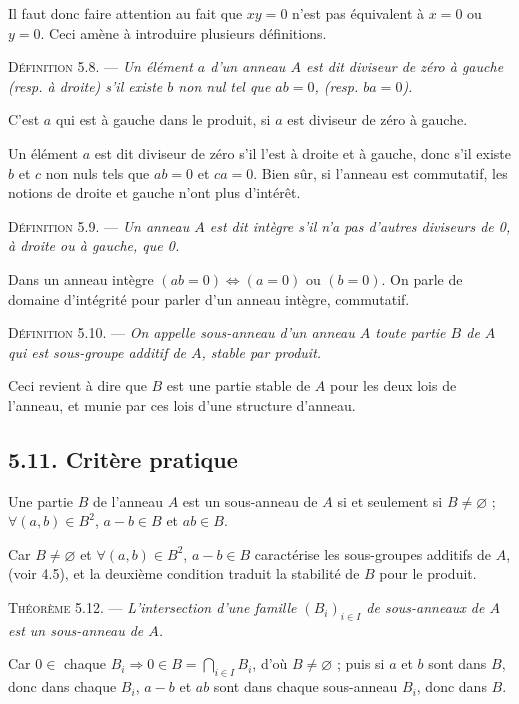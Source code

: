 Il faut donc faire attention au fait que $xy=0$ n'est pas équivalent à $x=0$ ou $y=0$. Ceci amène à introduire plusieurs définitions.

\medskip\noindent\textsc{Définition 5.8.} --- \emph{Un élément $a$ d'un anneau $A$ est dit diviseur de zéro à gauche (resp. à droite) s'il existe $b$ non nul tel que $ab=0$, (resp. $ba=0$).}

C'est $a$ qui est à gauche dans le produit, si $a$ est diviseur de zéro à gauche.

Un élément $a$ est dit diviseur de zéro s'il l'est à droite et à gauche, donc s'il existe $b$ et $c$ non nuls tels que $ab=0$ et $ca=0$. Bien sûr, si l'anneau est commutatif, les notions de droite et gauche n'ont plus d'intérêt.

\medskip\noindent\textsc{Définition 5.9.} --- \emph{Un anneau $A$ est dit intègre s'il n'a pas d'autres diviseurs de 0, à droite ou à gauche, que 0.}

Dans un anneau intègre $(ab=0)\Longleftrightarrow(a=0)$ ou $(b=0)$. On parle de domaine d'intégrité pour parler d'un anneau intègre, commutatif.

\medskip\noindent\textsc{Définition 5.10.} --- \emph{On appelle sous-anneau d'un anneau $A$ toute partie $B$ de $A$ qui est sous-groupe additif de $A$, stable par produit.}

Ceci revient à dire que $B$ est une partie stable de $A$ pour les deux lois de l'anneau, et munie par ces lois d'une structure d'anneau.

\subsection*{5.11. Critère pratique}
Une partie $B$ de l'anneau $A$ est un sous-anneau de $A$ si et seulement si $B\ne\varnothing$ ; $\forall(a,b)\in B^2$, $a-b\in B$ et $ab\in B$.

Car $B\ne\varnothing$ et $\forall(a,b)\in B^2$, $a-b\in B$ caractérise les sous-groupes additifs de $A$, (voir 4.5), et la deuxième condition traduit la stabilité de $B$ pour le produit.

\medskip\noindent\textsc{Théorème 5.12.} --- \emph{L'intersection d'une famille $(B_i)_{i\in I}$ de sous-anneaux de $A$ est un sous-anneau de $A$.}

Car $0\in$ chaque $B_i\Rightarrow0\in B=\bigcap_{i\in I}B_i$, d'où $B\ne\varnothing$ ; puis si $a$ et $b$ sont dans $B$, donc dans chaque $B_i$, $a-b$ et $ab$ sont dans chaque sous-anneau $B_i$, donc dans $B$. \bookend

